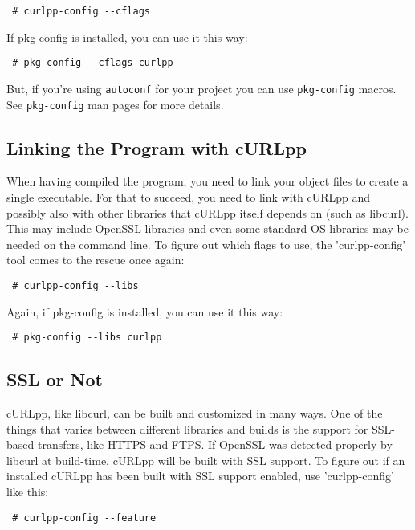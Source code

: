 \documentclass{article}
\begin{document}
\begin{verbatim} # curlpp-config --cflags\end{verbatim}

If pkg-config is installed, you can use it this way:

\begin{verbatim} # pkg-config --cflags curlpp\end{verbatim}  

But, if you're using \verb+autoconf+ for your project you can use 
\verb+pkg-config+ macros. See \verb+pkg-config+ man pages for more
details.

\subsection{Linking the Program with cURLpp}

When having compiled the program, you need to link your object files to
create a single executable. For that to succeed, you need to link with
cURLpp and possibly also with other libraries that cURLpp itself depends
on (such as libcurl). This may include OpenSSL libraries and even some standard
OS libraries may be needed on the command line. To figure out which flags to use,
the 'curlpp-config' tool comes to the rescue once again:

\begin{verbatim} # curlpp-config --libs\end{verbatim}

Again, if pkg-config is installed, you can use it this way:

\begin{verbatim} # pkg-config --libs curlpp\end{verbatim}  

\subsection{SSL or Not}

cURLpp, like libcurl, can be built and customized in many ways. One of the things that
varies between different libraries and builds is the support for SSL-based
transfers, like HTTPS and FTPS. If OpenSSL was detected properly by libcurl 
at build-time, cURLpp will be built with SSL support. To figure out if an
installed cURLpp has been built with SSL support enabled, use
'curlpp-config' like this:

\begin{verbatim} # curlpp-config --feature\end{verbatim}
\end{document}
